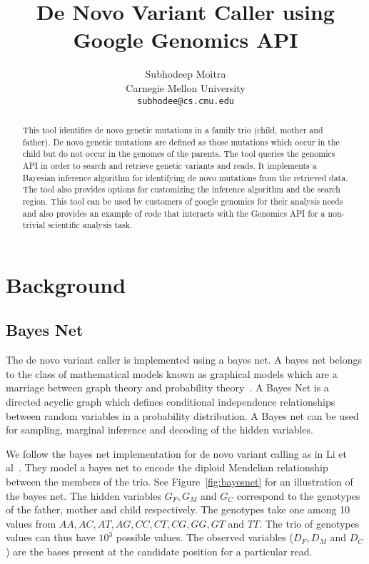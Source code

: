 \documentclass{article}
\begin{document}
\title{De Novo Variant Caller using Google Genomics API}

\author{
	Subhodeep Moitra\\ 
	Carnegie Mellon University \\
	{\tt subhodee@cs.cmu.edu}
}

\maketitle

\begin{abstract}
This tool identifies de novo genetic mutations in a family trio (child, mother and father). De novo genetic mutations are defined as those mutations which occur in the child but do not occur in the genomes of the parents. The tool queries the genomics API in order to search and retrieve genetic variants and reads. It implements a Bayesian inference algorithm for identifying  de novo mutations from the retrieved data. The tool also provides options for customizing the inference algorithm and the search region. This tool can be used by customers of google genomics for their analysis needs and also provides an example of code that interacts with the Genomics API for a non-trivial scientific analysis task.
\end{abstract} 

\section{Background}

\subsection{Bayes Net}
The de novo variant caller is implemented using a bayes net. A bayes net belongs to the class of mathematical models known as graphical models which are a marriage between graph theory and probability theory~\cite{Jordan2008}. A Bayes Net is a directed acyclic graph which defines conditional independence relationships between random variables in a probability distribution. A Bayes net can be used for sampling, marginal inference and decoding of the hidden variables. 

\vspace{5mm} 
We follow the bayes net implementation for de novo variant calling as in Li et al~\cite{Li2012}. They model a bayes net to encode the diploid Mendelian relationship between the members of the trio. See Figure~\ref{fig:bayesnet} for an illustration of the bayes net. The hidden variables $G_{F}, G_{M}$ and $G_{C}$ correspond to the genotypes of the father, mother and child respectively. The genotypes take one among 10 values from $AA, AC, AT, AG, CC, CT, CG, GG, GT$ and $TT$. The trio of genotypes values can thus have $10^3$ possible values. The observed variables ($D_F, D_M$ and $D_C$) are the bases present at the candidate position for a particular read. 
\end{document}
